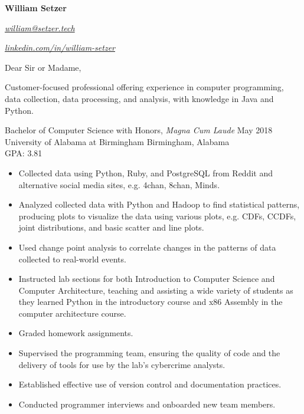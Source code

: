 \documentclass[10pt]{article}
\newcommand{\mailto}[1]{
  \href{mailto://#1}{\textit{#1}}
}
\newcommand{\linkedin}[1]{
  \href{https://linkedin.com/in/#1}{\textit{linkedin.com/in/#1}}
}
\begin{document}
  \begin{flushright}
    \textbf{William Setzer}

    \mailto{william@setzer.tech}

    \linkedin{william-setzer}
  \end{flushright}

  \bigskip

  Dear Sir or Madame,

  \bigskip

  Customer-focused professional offering experience in computer programming, data collection, data processing, and analysis, with knowledge in Java and Python.


  Bachelor of Computer Science with Honors, \textit{Magna Cum Laude} \hfill May 2018 \\
  University of Alabama at Birmingham \hfill Birmingham, Alabama \\
  GPA\@: 3.81


  \begin{itemize}[nosep]%
    \item Collected data using Python, Ruby, and PostgreSQL from Reddit and alternative social media sites, e.g. 4chan, 8chan, Minds.
    \item Analyzed collected data with Python and Hadoop to find statistical patterns, producing plots to visualize the data using various plots, e.g. CDFs, CCDFs, joint distributions, and basic scatter and line plots.
    \item Used change point analysis to correlate changes in the patterns of data collected to real-world events.
  \end{itemize}

  \begin{itemize}[nosep]
    \item Instructed lab sections for both Introduction to Computer Science and Computer Architecture, teaching and assisting a wide variety of students as they learned Python in the introductory course and x86 Assembly in the computer architecture course.
    \item Graded homework assignments.
  \end{itemize}

  \begin{itemize}[nosep]
    \item Supervised the programming team, ensuring the quality of code and the delivery of tools for use by the lab's cybercrime analysts.
    \item Established effective use of version control and documentation practices.
    \item Conducted programmer interviews and onboarded new team members.
  \end{itemize}
\end{document}
